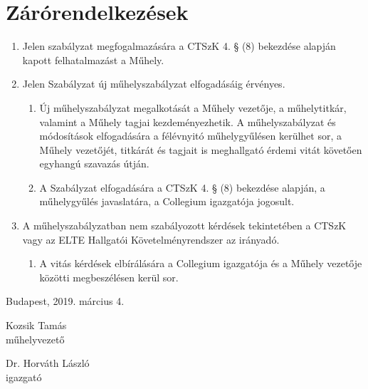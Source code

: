 \documentclass{../styles/rulebook}
\begin{document}
\section{Zárórendelkezések}

\begin{enumerate}
	\item Jelen szabályzat megfogalmazására a CTSzK 4. § (8) bekezdése alapján kapott felhatalmazást a Műhely.
	\item Jelen Szabályzat új műhelyszabályzat elfogadásáig érvényes.
	\begin{enumerate}
		\item Új műhelyszabályzat megalkotását a Műhely vezetője, a műhelytitkár, valamint a Műhely tagjai kezdeményezhetik. A műhelyszabályzat és módosítások elfogadására a félévnyitó műhelygyűlésen kerülhet sor, a Műhely vezetőjét, titkárát és tagjait is meghallgató érdemi vitát követően egyhangú szavazás útján.
		\item A Szabályzat elfogadására a CTSzK 4. § (8) bekezdése alapján, a műhelygyűlés javaslatára, a Collegium igazgatója jogosult.
	\end{enumerate}
	\item A műhelyszabályzatban nem szabályozott kérdések tekintetében a CTSzK vagy az ELTE Hallgatói Követelményrendszer az irányadó.
	\begin{enumerate}
		\item A vitás kérdések elbírálására a Collegium igazgatója és a Műhely vezetője közötti megbeszélésen kerül sor.
	\end{enumerate}
\end{enumerate}

\vspace{0.3in}
Budapest, 2019. március 4.
\vspace{0.6in}

\begin{minipage}{3in}
\begin{center}
Kozsik Tamás\\
műhelyvezető
\end{center}
\end{minipage}
\begin{minipage}{3in}
\begin{center}
Dr. Horváth László\\
igazgató
\end{center}
\end{minipage}
\end{document}
